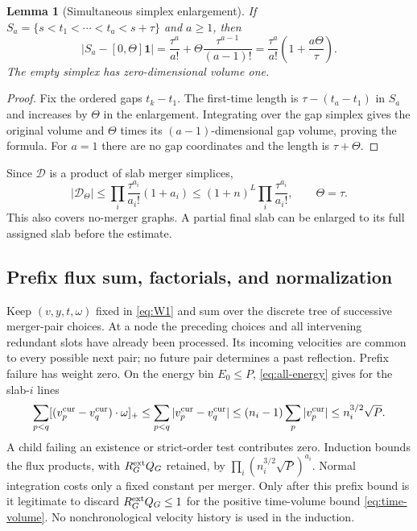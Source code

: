 \documentclass[11pt]{article}
\newtheorem{lemma}[theorem]{Lemma}
\theoremstyle{definition}\newtheorem{definition}[theorem]{Definition}
\theoremstyle{remark}\newtheorem{remark}[theorem]{Remark}
\numberwithin{equation}{section}
\begin{document}
\begin{lemma}[Simultaneous simplex enlargement]\label{lem:simplex}
If $S_a=\{s<t_1<\cdots<t_a<s+\tau\}$ and $a\ge1$, then
\begin{equation}\label{eq:simplex}
 |S_a-[0,\Theta]\mathbf1|
   =\frac{\tau^a}{a!}+\Theta\frac{\tau^{a-1}}{(a-1)!}
   =\frac{\tau^a}{a!}\left(1+\frac{a\Theta}{\tau}\right).
\end{equation}
The empty simplex has zero-dimensional volume one.
\end{lemma}
\begin{proof}
Fix the ordered gaps $t_k-t_1$. The first-time length is $\tau-(t_a-t_1)$
in $S_a$ and increases by $\Theta$ in the enlargement. Integrating over
the gap simplex gives the original volume and $\Theta$ times its
$(a-1)$-dimensional gap volume, proving the formula. For $a=1$ there are
no gap coordinates and the length is $\tau+\Theta$.
\end{proof}
Since $\mathcal D$ is a product of slab merger simplices,
\begin{equation}\label{eq:time-volume}
 |\mathcal D_\Theta|\le
 \prod_i\frac{\tau^{a_i}}{a_i!}(1+a_i)
 \le(1+n)^L\prod_i\frac{\tau^{a_i}}{a_i!},\qquad \Theta=\tau.
\end{equation}
This also covers no-merger graphs. A partial final slab can be enlarged
to its full assigned slab before the estimate.

\subsection{Prefix flux sum, factorials, and normalization}\label{subsec:flux}
Keep $(v,y,t,\omega)$ fixed in \eqref{eq:W1} and sum over the discrete tree
of successive merger-pair choices. At a node the preceding choices and all
intervening redundant slots have already been processed. Its incoming
velocities are common to every possible next pair; no future pair determines
a past reflection. Prefix failure has weight zero. On the energy bin
$E_0\le P$, \eqref{eq:all-energy} gives for the slab-$i$ lines
\begin{equation}\label{eq:flux}
 \sum_{p<q}[(v_p^{\rm cur}-v_q^{\rm cur})\cdot\omega]_+
 \le\sum_{p<q}|v_p^{\rm cur}-v_q^{\rm cur}|
 \le(n_i-1)\sum_p|v_p^{\rm cur}|
 \le n_i^{3/2}\sqrt P.
\end{equation}
A child failing an existence or strict-order test contributes zero.
Induction bounds the flux products, with $R_G^{\rm ext}Q_G$ retained,
by $\prod_i(n_i^{3/2}\sqrt P)^{a_i}$. Normal integration costs only a
fixed constant per merger. Only after this prefix bound is it legitimate
to discard $R_G^{\rm ext}Q_G\le1$ for the positive time-volume bound
\eqref{eq:time-volume}. No nonchronological velocity history is used in
the induction.
\end{document}
